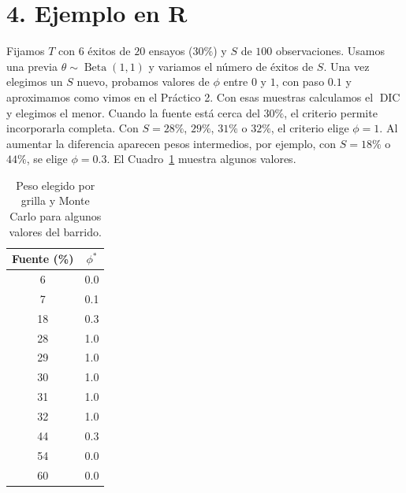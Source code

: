 \documentclass[10pt,a4paper]{article}
\newcommand{\BetaDist}{\operatorname{Beta}}
\newcommand{\DIC}{\operatorname{DIC}}
\newcommand{\etapa}[1]{\par\smallskip\textbf{#1.}\quad}
\begin{document}

\section{4. Ejemplo en R}\label{sec:ejemplo}

Fijamos $T$ con $6$ éxitos de $20$ ensayos ($30\%$) y $S$ de $100$ observaciones. Usamos una previa $\theta\sim\BetaDist(1,1)$ y variamos el número de éxitos de $S$. Una vez elegimos un $S$ nuevo, probamos valores de $\phi$ entre $0$ y $1$, con paso $0.1$ y aproximamos como vimos en el Práctico 2. Con esas muestras calculamos el $\DIC$ y elegimos el menor. Cuando la fuente está cerca del $30\%$, el criterio permite incorporarla completa. Con $S=28\%$, $29\%$, $31\%$ o $32\%$, el criterio elige $\phi=1$. Al aumentar la diferencia aparecen pesos intermedios, por ejemplo, con $S=18\%$ o $44\%$, se elige $\phi=0.3$. El Cuadro~\ref{tab:sensibilidad} muestra algunos valores.

\begin{table}[H]
\centering
\small
\begin{tabular}{@{}cc@{}}
\toprule
\textbf{Fuente (\%)} & $\phi^*$ \\
\midrule
6 & 0.0 \\
7 & 0.1 \\
18 & 0.3 \\
28 & 1.0 \\
29 & 1.0 \\
30 & 1.0 \\
31 & 1.0 \\
32 & 1.0 \\
44 & 0.3 \\
54 & 0.0 \\
60 & 0.0 \\
\bottomrule
\end{tabular}
\caption{Peso elegido por grilla y Monte Carlo para algunos valores del barrido.}
\label{tab:sensibilidad}
\end{table}
\end{document}

